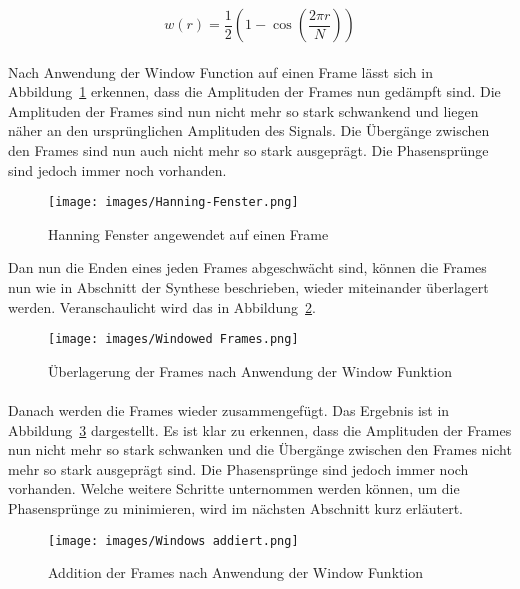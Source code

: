 \begin{equation}
    \label{eq:hann}
    w(r) = \frac{1}{2}\left(1 - \cos\left(\frac{2\pi r}{N}\right)\right)
\end{equation}

\paragraph{}
Nach Anwendung der Window Function auf einen Frame lässt sich in Abbildung~\ref{fig:hanning-window} erkennen, dass die Amplituden der Frames nun gedämpft sind. Die Amplituden der Frames sind nun nicht mehr so stark schwankend und liegen näher an den ursprünglichen Amplituden des Signals. Die Übergänge zwischen den Frames sind nun auch nicht mehr so stark ausgeprägt. Die Phasensprünge sind jedoch immer noch vorhanden.

\begin{figure}[h]
    \centering
    \texttt{[image: images/Hanning-Fenster.png]}
    \caption{Hanning Fenster angewendet auf einen Frame}
    \label{fig:hanning-window}
\end{figure}

Dan nun die Enden eines jeden Frames abgeschwächt sind, können die Frames nun wie in Abschnitt der Synthese beschrieben, wieder miteinander überlagert werden. Veranschaulicht wird das in Abbildung~\ref{fig:synthese-windowed}.

\begin{figure}[H]
    \centering
    \texttt{[image: images/Windowed Frames.png]}
    \caption{Überlagerung der Frames nach Anwendung der Window Funktion}
    \label{fig:synthese-windowed}
\end{figure}

\paragraph{}
Danach werden die Frames wieder zusammengefügt. Das Ergebnis ist in Abbildung~\ref{fig:synthese-windowed-added} dargestellt. Es ist klar zu erkennen, dass die Amplituden der Frames nun nicht mehr so stark schwanken und die Übergänge zwischen den Frames nicht mehr so stark ausgeprägt sind. Die Phasensprünge sind jedoch immer noch vorhanden. Welche weitere Schritte unternommen werden können, um die Phasensprünge zu minimieren, wird im nächsten Abschnitt kurz erläutert.

\begin{figure}[H]
    \centering
    \texttt{[image: images/Windows addiert.png]}
    \caption{Addition der Frames nach Anwendung der Window Funktion}
    \label{fig:synthese-windowed-added}
\end{figure}

